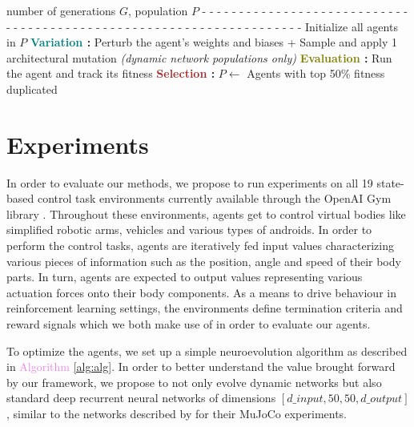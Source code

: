 \documentclass{article} %
\begin{document}
\begin{algorithm}[H]
\caption{Neuroevolution Algorithm }\label{alg:alg}
\begin{algorithmic}
 number of generations $G$, population $P$
\State - - - - - - - - - - - - - - - - - - - - - - - - - - - - - - - - - - - - - - - - - - - - - - - - - - - - - - - - - - - - - - - - - - - -
\State Initialize all agents in $P$
\State \textbf{\textcolor{teal}{Variation} :} Perturb the agent's weights and biases
\State \;\;\;\;\;\;\;\;\;\;\;\;\;\;\;+ Sample and apply 1 architectural mutation \textit{\footnotesize (dynamic network populations only)}
\State \textbf{\textcolor{olive}{Evaluation} :} Run the agent and track its fitness
\EndFor
\State \textbf{\textcolor{brown}{Selection} :} $P \leftarrow$ Agents with top 50\% fitness duplicated
\EndFor
\end{algorithmic}
\end{algorithm}


\section{Experiments}
\vspace{-.5em}
In order to evaluate our methods, we propose to run experiments on all 19 state-based control task environments currently available through the OpenAI Gym library \citep{brockman2016openai}. Throughout these environments, agents get to control virtual bodies like simplified robotic arms, vehicles and various types of androids. In order to perform the control tasks, agents are iteratively fed input values characterizing various pieces of information such as the position, angle and speed of their body parts. In turn, agents are expected to output values representing various actuation forces onto their body components. As a means to drive behaviour in reinforcement learning settings, the environments define termination criteria and reward signals which we both make use of in order to evaluate our agents.

To optimize the agents, we set up a simple neuroevolution algorithm as described in \textcolor{violet}{Algorithm \ref{alg:alg}}. In order to better understand the value brought forward by our framework, we propose to not only evolve dynamic networks but also standard deep recurrent neural networks of dimensions \mbox{$[d\_input, 50, 50, d\_output]$}, similar to the networks described by \cite{salimans2017evolution} for their MuJoCo experiments.
\end{document}
